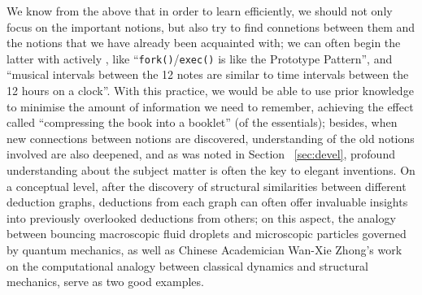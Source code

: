 We know from the above that in order to learn efficiently, we should not only
focus on the important notions, but also try to find connetions between them
and the notions that we have already been acquainted with; we can often begin
the latter with actively ,
like ``\verb|fork()|/\verb|exec()| is like the Prototype Pattern'', and
``musical intervals between the 12 notes are similar to time intervals between
the 12 hours on a clock''.  With this practice, we would be able to use prior
knowledge to minimise the amount of information we need to remember, achieving
the effect called ``compressing the book into a booklet'' (of the essentials);
besides, when new connections between notions are discovered, understanding
of the old notions involved are also deepened, and as was noted in Section~%
\ref{sec:devel}, profound understanding about the subject matter is often the
key to elegant inventions.  On a conceptual level, after the discovery of
structural similarities between different deduction graphs, deductions from
each graph can often offer invaluable insights into previously overlooked
deductions from others; on this aspect, the analogy between bouncing macroscopic
fluid droplets and microscopic particles governed by quantum mechanics, as well
as Chinese Academician Wan-Xie Zhong's work on the computational analogy between
classical dynamics and structural mechanics, serve as two good examples.

